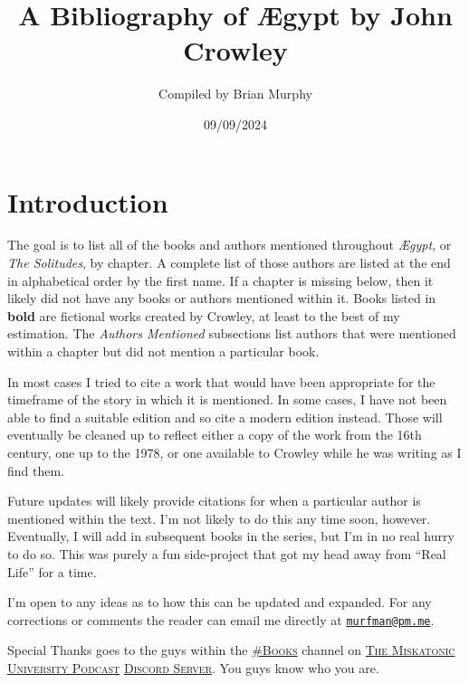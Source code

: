 \documentclass[12pt]{article}
\title{A Bibliography of Ægypt by John Crowley}
\author{Compiled by Brian Murphy}
\date{09/09/2024}
\begin{document}
{\let\cleardoublepage\clearpage 
\maketitle
}

\section{Introduction}\label{introduction}

The goal is to list all of the books and authors mentioned throughout \emph{Ægypt}, or \emph{The Solitudes}, by chapter. A complete list of those authors are listed at the end in alphabetical order by the first name. If a chapter is missing below, then it likely did not have any books or authors mentioned within it. Books listed in \textbf{bold} are fictional works created by Crowley, at least to the best of my estimation. The \emph{Authors Mentioned} subsections list authors that were mentioned within a chapter but did not mention a particular book.

In most cases I tried to cite a work that would have been appropriate for the timeframe of the story in which it is mentioned. In some cases, I have not been able to find a suitable edition and so cite a modern edition instead. Those will eventually be cleaned up to reflect either a copy of the work from the 16th century, one up to the 1978, or one available to Crowley while he was writing as I find them.

Future updates will likely provide citations for when a particular author is mentioned within the text. I'm not likely to do this any time soon, however. Eventually, I will add in subsequent books in the series, but I'm in no real hurry to do so. This was purely a fun side-project that got my head away from ``Real Life'' for a time.

I'm open to any ideas as to how this can be updated and expanded. For any corrections or comments the reader can email me directly at \href{mailto:murfman@pm.me}{\nolinkurl{murfman@pm.me}}.

Special Thanks goes to the guys within the \href{https://discord.com/channels/460145057975238714/474725139297337367}{\textsc{\#Books}} channel on \href{https://www.mu-podcast.com/}{\textsc{The Miskatonic University Podcast}} \href{https://discord.com/channels/460145057975238714/}{\textsc{Discord Server}}. You guys know who you are.

\bigskip 
\end{document}
